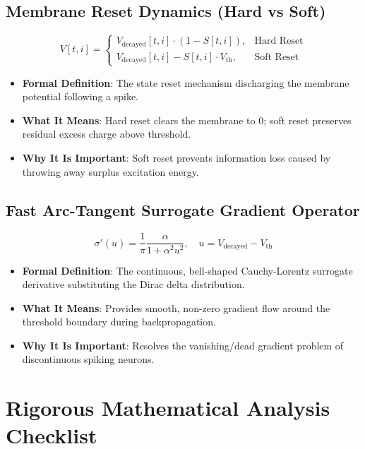 \documentclass[11pt,a4paper]{article}
\theoremstyle{definition}
\begin{document}
\subsection{Membrane Reset Dynamics (Hard vs Soft)}
{\boldmath
\begin{equation}
V[t, i] = 
\begin{cases}
V_{\text{decayed}}[t, i] \cdot (1 - S[t, i]), & \text{Hard Reset} \\
V_{\text{decayed}}[t, i] - S[t, i] \cdot V_{\text{th}}, & \text{Soft Reset}
\end{cases}
\end{equation}
}
\begin{itemize}
    \item \textbf{Formal Definition}: The state reset mechanism discharging the membrane potential following a spike.
    \item \textbf{What It Means}: Hard reset clears the membrane to 0; soft reset preserves residual excess charge above threshold.
    \item \textbf{Why It Is Important}: Soft reset prevents information loss caused by throwing away surplus excitation energy.
\end{itemize}

\subsection{Fast Arc-Tangent Surrogate Gradient Operator}
{\boldmath
\begin{equation}
\sigma'(u) = \frac{1}{\pi} \frac{\alpha}{1 + \alpha^2 u^2}, \quad u = V_{\text{decayed}} - V_{\text{th}}
\end{equation}
}
\begin{itemize}
    \item \textbf{Formal Definition}: The continuous, bell-shaped Cauchy-Lorentz surrogate derivative substituting the Dirac delta distribution.
    \item \textbf{What It Means}: Provides smooth, non-zero gradient flow around the threshold boundary during backpropagation.
    \item \textbf{Why It Is Important}: Resolves the vanishing/dead gradient problem of discontinuous spiking neurons.
\end{itemize}

\section{Rigorous Mathematical Analysis Checklist}
\end{document}
